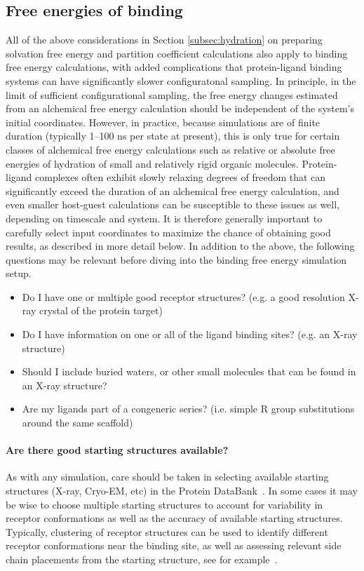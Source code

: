 \documentclass[9pt,bestpractices]{livecoms}
\begin{document}
\subsection{Free energies of binding}
\label{subsec:binding}
All of the above considerations in Section \ref{subsec:hydration} on preparing solvation free energy and partition coefficient calculations also apply to binding free energy calculations, with added complications that protein-ligand binding systems can have significantly slower configuratonal sampling. In principle, in the limit of sufficient configurational sampling, the free energy changes estimated from an alchemical free energy calculation should be independent of the system's initial coordinates. However, in practice, because simulations are of finite duration (typically 1--100 ns per state at present), this is only true for certain classes of alchemical free energy calculations such as relative or absolute free energies of hydration of small and relatively rigid organic molecules. Protein-ligand complexes often exhibit slowly relaxing degrees of freedom that can significantly exceed the duration of an alchemical free energy calculation, and even smaller host-guest calculations can be susceptible to these issues as well, depending on timescale and system. It is therefore generally important to carefully select input coordinates to maximize the chance of obtaining good results, as described in more detail below.  
In addition to the above, the following questions may be relevant before diving into the binding free energy simulation setup.

\begin{itemize}
    \item Do I have one or multiple good receptor structures? (e.g. a good resolution X-ray crystal of the protein target)
    \item Do I have information on one or all of the ligand binding sites? (e.g. an X-ray structure)
    \item Should I include buried waters, or other small molecules that can be found in an X-ray structure?
    \item Are my ligands part of a congeneric series? (i.e. simple R group substitutions around the same scaffold)
    \end{itemize}

\paragraph{Are there good starting structures available?}
As with any simulation, care should be taken in selecting available starting structures (X-ray, Cryo-EM, etc) in the Protein DataBank~\cite{berman2003announcing}. In some cases it may be wise to choose multiple starting structures to account for variability in receptor conformations as well as the accuracy of available starting structures. Typically, clustering of receptor structures can be used to identify different receptor conformations near the binding site, as well as assessing relevant side chain placements from the starting structure, see for example~\cite{mey2016blinded}. 
\end{document}
